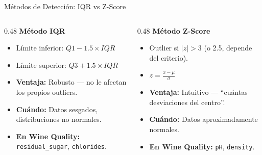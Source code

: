 \documentclass[aspectratio=169, 11pt]{beamer}
\begin{document}
\begin{frame}[shrink=5]{Métodos de Detección: IQR vs Z-Score}
  \vspace{-4pt}
  \begin{columns}[T]
    \begin{column}{0.48\textwidth}
      {\footnotesize\bfseries\color{codeBlue} Método IQR}
      \vspace{4pt}

      {\scriptsize
      \begin{itemize}\setlength{\itemsep}{4pt}
        \item Límite inferior: $Q1 - 1.5 \times IQR$
        \item Límite superior: $Q3 + 1.5 \times IQR$
        \item \textbf{Ventaja:} Robusto --- no le afectan los propios outliers.
        \item \textbf{Cuándo:} Datos sesgados, distribuciones no normales.
        \item \textbf{En Wine Quality:} \texttt{residual\_sugar}, \texttt{chlorides}.
      \end{itemize}
      }
    \end{column}

    \begin{column}{0.48\textwidth}
      {\footnotesize\bfseries\color{codePurple} Método Z-Score}
      \vspace{4pt}

      {\scriptsize
      \begin{itemize}\setlength{\itemsep}{4pt}
        \item Outlier si $|z| > 3$ (o 2.5, depende del criterio).
        \item $z = \frac{x - \mu}{\sigma}$
        \item \textbf{Ventaja:} Intuitivo --- ``cuántas desviaciones del centro''.
        \item \textbf{Cuándo:} Datos aproximadamente normales.
        \item \textbf{En Wine Quality:} \texttt{pH}, \texttt{density}.
      \end{itemize}
      }
    \end{column}
  \end{columns}

  \vspace{8pt}
  \begin{center}
  \end{center}
\end{frame}
\end{document}

